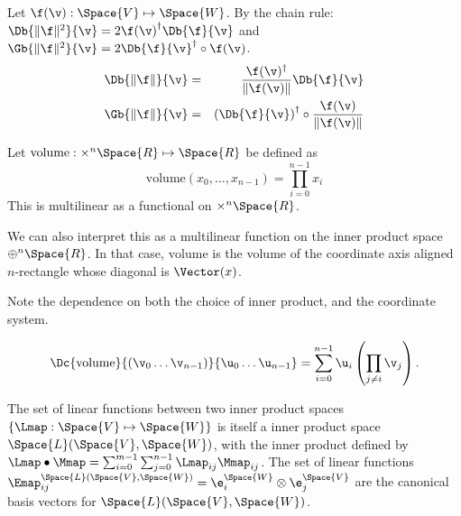 Let $\f(\v) : \Space{V} \mapsto \Space{W}$.
By the chain rule:
$\Db{\| \f \|^2}{\v}  =  2 {\f(\v)}^{\dagger} \Db{\f}{\v} $
and
$\Gb{\| \f \|^2}{\v}  =  2 \Db{\f}{\v}^\dagger \circ \f(\v)$.
\begin{eqnarray}
\label{eq:norm_derivative}
\Db{\| \f \|}{\v}
& = &
\frac{\f(\v)^\dagger}{\| \f(\v) \|} \Db{\f}{\v}  \\
\Gb{\| \f \|}{\v}
& = &
\left(\Db{\f}{\v}\right)^\dagger \circ  \frac{\f(\v)}{ \| \f(\v)  \|}
\label{eq:norm_gradient}
\end{eqnarray}

\label{sec:Derivative-of-canonical-vector-volume}

Let $\text{volume} : \times^{n} \Space{R} \mapsto \Space{R}$ 
be defined as
\begin{equation}
\text{volume} \left( x_0 , \ldots , x_{n-1} \right) = \prod_{i=0}^{n-1} x_i
\end{equation}
This is multilinear as a functional on $\times^{n} \Space{R}$.

We can also interpret this as a multilinear function on the
inner product space
$\oplus^{n} \Space{R}$.
In that case, $\text{volume}$ is the volume of the coordinate axis aligned
$n$-rectangle whose diagonal is $\Vector(x)$.

Note the dependence on both the choice of inner product, 
and the coordinate system.

\begin{equation}
\Dc{\text{volume}}{(\v_0 \ldots \v_{n-1})}{\u_0 \ldots \u_{n-1}}
 =  \sum_{i=0}^{n-1} \u_i \left( \prod_{j \neq i} \v_j \right).
\end{equation}

\label{sec:Derivatives-of-linear-function-valued-functions}

The set of linear functions between two inner product spaces
$\{ \Lmap : \Space{V} \mapsto \Space{W} \}$
is itself a inner product space $\Space{L}(\Space{V},\Space{W})$,
with the inner product defined by
$\Lmap \bullet \Mmap = \sum_{i=0}^{m-1} \sum_{j=0}^{n-1} \Lmap_{ij} \Mmap_{ij}$.
The set of linear functions
$\Emap_{ij}^{\Space{L}(\Space{V},\Space{W})}  = \e_i^{\Space{W}} \otimes \e_j^{\Space{V}}$
are the canonical basis vectors for $\Space{L}(\Space{V},\Space{W})$.

